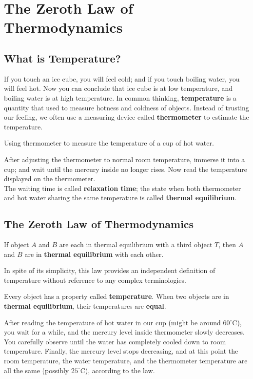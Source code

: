 \documentclass[phyai.tex]{subfiles}
\begin{document}
\chapter{The Zeroth Law of Thermodynamics}\label{chap:the_zeroth_law_of_thermodynamics} %
\section{What is Temperature?}\label{sec:what_is_temperature_} %
If you touch an ice cube, you will feel cold; and if you touch boiling water, you will feel hot. Now you can conclude that ice cube is at low temperature, and boiling water is at high temperature. In common thinking, \textbf{temperature} is a quantity that used to measure hotness and coldness of objects. Instead of trusting our feeling, we often use a measuring device called \textbf{thermometer} to estimate the temperature.
\begin{exmp}
	Using thermometer to measure the temperature of a cup of hot water.
\end{exmp}
After adjusting the thermometer to normal room temperature, immerse it into a cup; and wait until the mercury inside no longer rises. Now read the temperature displayed on the thermometer.
\\ The waiting time is called \textbf{relaxation time}; the state when both thermometer and hot water sharing the same temperature is called \textbf{thermal equilibrium}.
\section{The Zeroth Law of Thermodynamics}\label{sec:the_zeroth_law_of_thermodynamics} %
\begin{theorem}
	\label{The Zeroth Law of Thermodynamics}
	If object $A$ and $B$ are each in thermal equilibrium with a third object $T$, then $A$ and $B$ are in \textbf{thermal equilibrium} with each other.
\end{theorem}
In spite of its simplicity, this law provides an independent definition of temperature without reference to any complex terminologies.
\begin{corollary}
	Every object has a property called \textbf{temperature}. When two objects are in \textbf{thermal equilibrium}, their temperatures are \textbf{equal}.
	\label{The First Definition of Temperature}
\end{corollary}
After reading the temperature of hot water in our cup (might be around $ 60^{\circ} \text{C}$), you wait for a while, and the mercury level inside thermometer slowly decreases. You carefully observe until the water has completely cooled down to room temperature. Finally, the mercury level stops decreasing, and at this point the room temperature, the water temperature, and the thermometer temperature are all the same (possibly $ 25^{\circ}\text{C} $), according to the law.
\end{document}
